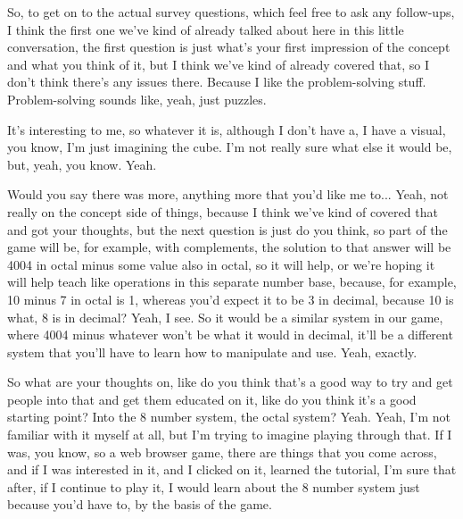 \documentclass{article}
\begin{document}
So, to get on to the actual survey questions, which feel free to ask any follow-ups, I think the first
one we've kind of already talked about here in this little conversation, the first question is just
what's your first impression of the concept and what you think of it, but I think we've kind of
already covered that, so I don't think there's any issues there. Because I like the problem-solving
stuff. Problem-solving sounds like, yeah, just puzzles.

It's interesting to me, so whatever it is, although I don't have a, I have a visual, you know, I'm just
imagining the cube. I'm not really sure what else it would be, but, yeah, you know. Yeah.

Would you say there was more, anything more that you'd like me to... Yeah, not really on the
concept side of things, because I think we've kind of covered that and got your thoughts, but the
next question is just do you think, so part of the game will be, for example, with complements, the
solution to that answer will be 4004 in octal minus some value also in octal, so it will help, or
we're hoping it will help teach like operations in this separate number base, because, for
example, 10 minus 7 in octal is 1, whereas you'd expect it to be 3 in decimal, because 10 is what,
8 is in decimal? Yeah, I see. So it would be a similar system in our game, where 4004 minus
whatever won't be what it would in decimal, it'll be a different system that you'll have to learn how
to manipulate and use. Yeah, exactly.

So what are your thoughts on, like do you think that's a good way to try and get people into that
and get them educated on it, like do you think it's a good starting point? Into the 8 number
system, the octal system? Yeah. Yeah, I'm not familiar with it myself at all, but I'm trying to
imagine playing through that. If I was, you know, so a web browser game, there are things that
you come across, and if I was interested in it, and I clicked on it, learned the tutorial, I'm sure that
after, if I continue to play it, I would learn about the 8 number system just because you'd have to,
by the basis of the game.
\end{document}
